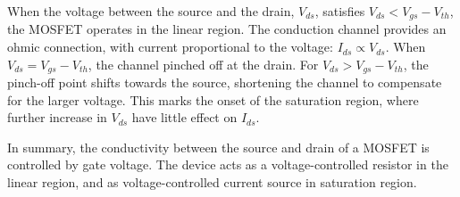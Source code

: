 When the voltage between the source and the drain, $V_{ds}$, satisfies $V_{ds}<V_{gs}-V_{th}$, the MOSFET operates in the linear region. The conduction channel provides an ohmic connection, with current proportional to the voltage: $I_{ds} \propto V_{ds}$. When $V_{ds} = V_{gs}-V_{th}$, the channel pinched off at the drain. For $V_{ds} > V_{gs}-V_{th}$, the pinch-off point shifts towards the source, shortening the channel to compensate for the larger voltage. This marks the onset of the saturation region, where further increase in $V_{ds}$ have little effect on $I_{ds}$.

In summary, the conductivity between the source and drain of a MOSFET is controlled by gate voltage. The device acts as a voltage-controlled resistor in the linear region, and as voltage-controlled current source in saturation region.
